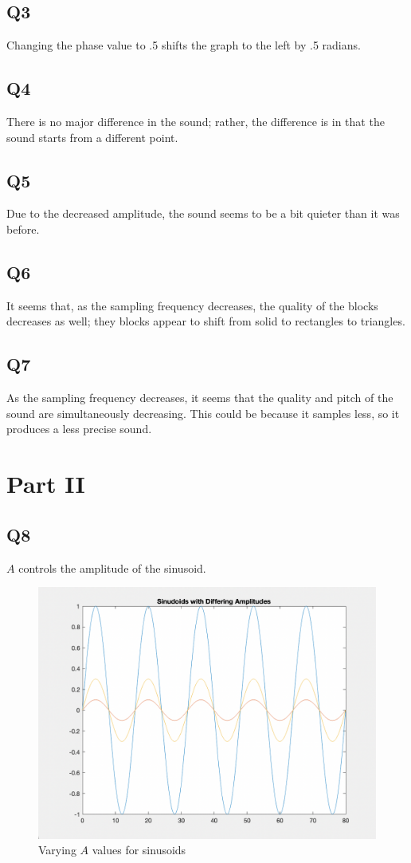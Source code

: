 \documentclass[
	letterpaper, %
	10pt, %
]{CSUniSchoolLabReport}
\begin{document}
\subsection{Q3} Changing the phase value to .5 shifts the graph to the left by .5 radians.

\subsection{Q4} There is no major difference in the sound; rather, the difference is in that the sound starts from a different point.

\subsection{Q5} Due to the decreased amplitude, the sound seems to be a bit quieter than it was before.

\subsection{Q6} It seems that, as the sampling frequency decreases, the quality of the blocks decreases as well; they blocks appear to shift from solid to rectangles to triangles.

\subsection{Q7} As the sampling frequency decreases, it seems that the quality and pitch of the sound are simultaneously decreasing. This could be because it samples less, so it produces a less precise sound.

\section{Part II}

\subsection{Q8} $A$ controls the amplitude of the sinusoid.

\begin{figure}[H]
  \centering
  \includegraphics[width=.9\textwidth]{Figures/L7Ampl.png}
  \caption{Varying $A$ values for sinusoids}
  \label{fig:1}
\end{figure}
\end{document}
